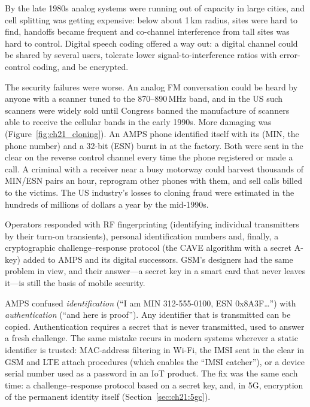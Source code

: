 By the late 1980s analog systems were running out of capacity in large cities, and cell splitting
was getting expensive: below about 1\,km radius, sites were hard to find, handoffs became frequent
and co-channel interference from tall sites was hard to control. Digital speech coding offered a
way out: a digital channel could be shared by several users, tolerate lower signal-to-interference
ratios with error-control coding, and be encrypted.


The security failures were worse. An analog FM conversation could be heard by anyone with a scanner
tuned to the 870--890\,MHz band, and in the US such scanners were widely sold until Congress banned
the manufacture of scanners able to receive the cellular bands in the early 1990s. More damaging was
 (Figure~\ref{fig:ch21_cloning}). An AMPS phone identified itself with its
 (MIN, the phone number) and a 32-bit
 (ESN) burnt in at the factory. Both were sent in the clear on the
reverse control channel every time the phone registered or made a call. A criminal with a receiver
near a busy motorway could harvest thousands of MIN/ESN pairs an hour, reprogram other phones with
them, and sell calls billed to the victims. The US industry's losses to cloning fraud were estimated
in the hundreds of millions of dollars a year by the mid-1990s.

Operators responded with RF fingerprinting (identifying individual transmitters by their turn-on
transients), personal identification numbers and, finally, a cryptographic challenge--response
protocol (the CAVE algorithm with a secret A-key) added to AMPS and its digital successors. GSM's
designers had the same problem in view, and their answer---a secret key in a smart card that never
leaves it---is still the basis of mobile security.

\begin{pitfall}
AMPS confused \emph{identification} (``I am MIN 312-555-0100, ESN 0x8A3F\ldots'') with
\emph{authentication} (``and here is proof''). Any identifier that is transmitted can be copied.
Authentication requires a secret that is never transmitted, used to answer a fresh challenge. The
same mistake recurs in modern systems wherever a static identifier is trusted: MAC-address filtering
in Wi-Fi, the IMSI sent in the clear in GSM and LTE attach procedures (which enables the ``IMSI
catcher''), or a device serial number used as a password in an IoT product. The fix was the same
each time: a challenge--response protocol based on a secret key, and, in 5G, encryption of the
permanent identity itself (Section~\ref{sec:ch21:5gc}).
\end{pitfall}

